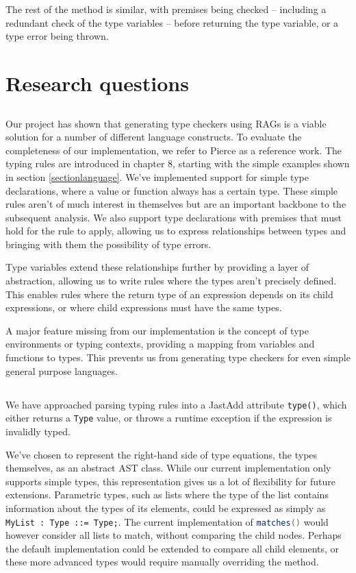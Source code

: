 \documentclass[nofilelist]{cslthse-msc}
\begin{document}
The rest of the method is similar, with premises being checked -- including a redundant check of the type variables -- before returning the type variable, or a type error being thrown.

\section{Research questions}
\subsection{\rqone}
Our project has shown that generating type checkers using RAGs is a viable solution for a number of different language constructs.
To evaluate the completeness of our implementation, we refer to Pierce\cite{Pierce} as a reference work.
The typing rules are introduced in chapter 8, starting with the simple examples shown in section \ref{sectionlanguage}.
We've implemented support for simple type declarations, where a value or function always has a certain type.
These simple rules aren't of much interest in themselves but are an important backbone to the subsequent analysis.
We also support type declarations with premises that must hold for the rule to apply, allowing us to express relationships between types and bringing with them the possibility of type errors.

Type variables extend these relationships further by providing a layer of abstraction, allowing us to write rules where the types aren't precisely defined.
This enables rules where the return type of an expression depends on its child expressions, or where child expressions must have the same types.

A major feature missing from our implementation is the concept of type environments or typing contexts, providing a mapping from variables and functions to types.
This prevents us from generating type checkers for even simple general purpose languages.

\subsection{\rqtwo}
We have approached parsing typing rules into a JastAdd attribute \verb|type()|, which either returns a \verb|Type| value, or throws a runtime exception if the expression is invalidly typed.

We've chosen to represent the right-hand side of type equations, the types themselves, as an abstract AST class.
While our current implementation only supports simple types, this representation gives us a lot of flexibility for future extensions.
Parametric types, such as lists where the type of the list contains information about the types of its elements, could be expressed as simply as \lstinline{MyList : Type ::= Type;}.
The current implementation of \lstinline[language=java]{matches()} would however consider all lists to match, without comparing the child nodes.
Perhaps the default implementation could be extended to compare all child elements, or these more advanced types would require manually overriding the method.
\end{document}

